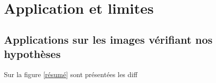 \section{Application et limites}
\subsection{Applications sur les images  vérifiant nos hypothèses}
Sur la figure \ref{résumé} sont présentées les diff